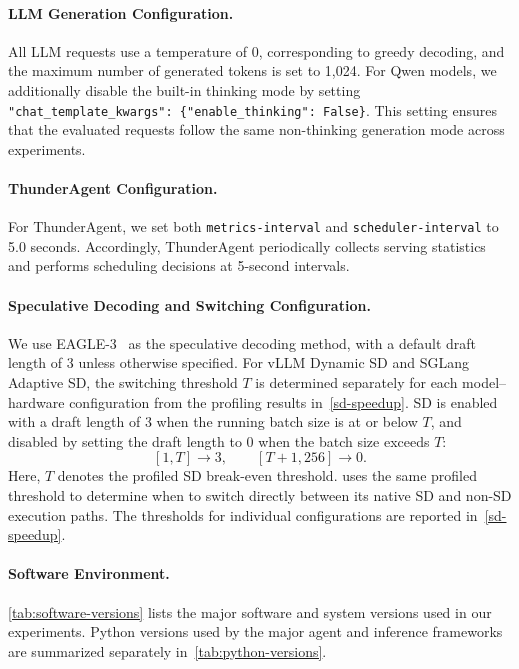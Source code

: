 \paragraph{LLM Generation Configuration.}
All LLM requests use a temperature of 0, corresponding to greedy decoding, and the maximum number of generated tokens is set to 1,024. For Qwen models, we additionally disable the built-in thinking mode by setting
\texttt{"chat\_template\_kwargs": \{"enable\_thinking": False\}}.
This setting ensures that the evaluated requests follow the same non-thinking generation mode across experiments.

\paragraph{ThunderAgent Configuration.}
For ThunderAgent, we set both \texttt{metrics-interval} and \texttt{scheduler-interval} to 5.0 seconds. Accordingly, ThunderAgent periodically collects serving statistics and performs scheduling decisions at 5-second intervals.

\paragraph{Speculative Decoding and Switching Configuration.}
We use EAGLE-3~\citep{eagle3} as the speculative decoding method, with a default draft length of 3 unless otherwise specified. For vLLM Dynamic SD and SGLang Adaptive SD, the switching threshold \(T\) is determined separately for each model--hardware configuration from the profiling results in~\autoref{sd-speedup}. SD is enabled with a draft length of 3 when the running batch size is at or below \(T\), and disabled by setting the draft length to 0 when the batch size exceeds \(T\):
\[
[1,T]\rightarrow 3,\qquad [T+1,256]\rightarrow 0.
\]
Here, \(T\) denotes the profiled SD break-even threshold. \sysname uses the same profiled threshold to determine when to switch directly between its native SD and non-SD execution paths. The thresholds for individual configurations are reported in~\autoref{sd-speedup}.

\paragraph{Software Environment.}
\autoref{tab:software-versions} lists the major software and system versions used in our experiments. Python versions used by the major agent and inference frameworks are summarized separately in~\autoref{tab:python-versions}.

